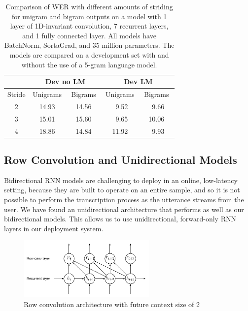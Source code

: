 \documentclass{article}
\begin{document}
\begin{table}
\centering
\begin{tabular}{c  r r r  r r r  r r r  r r r}
\toprule
& \multicolumn{6}{c}{Dev no LM} & \multicolumn{6}{c}{Dev LM}\\
\midrule
Stride  & \multicolumn{3}{c}{Unigrams} & \multicolumn{3}{c}{Bigrams} & \multicolumn{3}{c}{Unigrams} & \multicolumn{3}{c}{Bigrams} \\
\midrule
2 & & 14.93 & & & 14.56 & & & 9.52  & & & 9.66  & \\
3 & & 15.01 & & & 15.60 & & & 9.65  & & & 10.06 & \\
4 & & 18.86 & & & 14.84 & & & 11.92 & & & 9.93  & \\
\bottomrule
\end{tabular}
\rule{0pt}{2.6ex}
\caption{Comparison of WER with different amounts of striding for unigram and bigram outputs on a model with 1 layer of 1D-invariant convolution, 7 recurrent layers, and 1 fully connected layer. All models have BatchNorm, SortaGrad, and 35 million parameters. The models are compared on a development set with and without the use of a 5-gram language model.}
\label{table:bigrams}
\end{table}

\subsection{Row Convolution and Unidirectional Models}
\label{section:fom}

Bidirectional RNN models are challenging to deploy in an online, low-latency setting, because they are built to operate on an entire sample, and so it is not possible to perform the transcription process as the utterance streams from the user. We have found an unidirectional architecture that performs as well as our bidirectional models. This allows us to use unidirectional, forward-only RNN layers in our deployment system. 

\begin{figure}
\centering
\includegraphics[width=0.6\textwidth]{row-conv}
\caption{Row convolution architecture with future context size of 2}
\label{fig:row-conv}
\end{figure}
\end{document}
